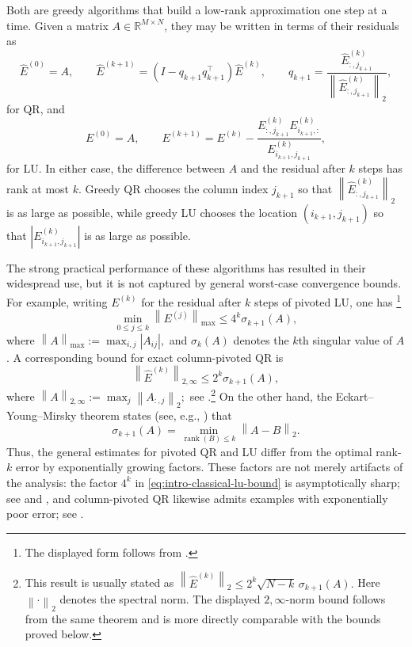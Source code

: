 \documentclass[11pt]{article}
\theoremstyle{definition}
\theoremstyle{remark}
\newcommand{\R}{\mathbb{R}}
\newcommand{\norm}[1]{\left\lVert #1\right\rVert}
\newcommand{\abs}[1]{\left\lvert #1\right\rvert}
\begin{document}
Both are greedy algorithms that build a low-rank approximation one step at
a time. Given a matrix $A\in\R^{M\times N}$, they may be written in terms
of their residuals as
\begin{equation*}
    \widehat E^{(0)}=A,
    \qquad
    \widehat E^{(k+1)}
    =
    (I-q_{k+1}q_{k+1}^\top)\widehat E^{(k)},
    \qquad
    q_{k+1}
    =
    \frac{\widehat E^{(k)}_{:,j_{k+1}}}
         {\norm{\widehat E^{(k)}_{:,j_{k+1}}}_2},
\end{equation*}
for QR, and
\begin{equation*}
    E^{(0)}=A,
    \qquad
    E^{(k+1)}
    =
    E^{(k)}
    -
    \frac{
      E^{(k)}_{:,j_{k+1}}E^{(k)}_{i_{k+1},:}
    }{
      E^{(k)}_{i_{k+1},j_{k+1}}
    },
\end{equation*}
for LU. In either case, the difference between $A$ and the residual after
$k$ steps has rank at most $k$. Greedy QR chooses the column index
$j_{k+1}$ so that
$\norm{\widehat E^{(k)}_{:,j_{k+1}}}_2$ is as large as possible, while
greedy LU chooses the location $(i_{k+1},j_{k+1})$ so that
$\abs{E^{(k)}_{i_{k+1},j_{k+1}}}$ is as large as possible.

The strong practical performance of these algorithms has resulted in their
widespread use, but it is not captured by general worst-case convergence
bounds. For example, writing $E^{(k)}$ for the residual after $k$ steps of
pivoted LU, one has
\cite{CortinovisKressnerMassei2020}\footnote{The displayed form follows
from \cite[Remark~7]{CortinovisKressnerMassei2020}.}
\begin{equation}
    \min_{0\le j\le k}\norm{E^{(j)}}_{\max}
    \le
    4^k\sigma_{k+1}(A),
    \label{eq:intro-classical-lu-bound}
\end{equation}
where
$
    \norm{A}_{\max}:=\max_{i,j}\abs{A_{ij}},
$
and $\sigma_k(A)$ denotes the $k$th singular value of $A$. A corresponding
bound for exact column-pivoted QR is
\begin{equation}
    \norm{\widehat E^{(k)}}_{2,\infty}
    \le
    2^k\sigma_{k+1}(A),
    \label{eq:intro-classical-qr-bound}
\end{equation}
where
$
    \norm{A}_{2,\infty}:=\max_j\norm{A_{:,j}}_2;
$
see \cite[Theorem~7.2]{GuEisenstat1996}.\footnote{This result is usually
stated as
$
    \norm{\widehat E^{(k)}}_2
    \le
    2^k\sqrt{N-k}\,\sigma_{k+1}(A).
$
Here $\norm{\cdot}_2$ denotes the spectral norm. The displayed
$2,\infty$-norm bound follows from the same theorem and is more directly
comparable with the bounds proved below.}
On the other hand, the Eckart--Young--Mirsky theorem states
(see, e.g., \cite{trefethen_book}) that
\[
    \sigma_{k+1}(A)
    =
    \min_{\operatorname{rank}(B)\le k}\norm{A-B}_2.
\]
Thus, the general estimates for pivoted QR and LU differ from the optimal
rank-$k$ error by exponentially growing factors. These factors are not
merely artifacts of the analysis: the factor $4^k$ in
\eqref{eq:intro-classical-lu-bound} is asymptotically sharp; see
\cite[Remark~3.3]{HarbrechtPetersSchneider2012} and
\cite[Section~6.2]{Higham1987}, and column-pivoted QR likewise admits
examples with exponentially poor error; see
\cite[Example~1]{GuEisenstat1996}.
\end{document}
